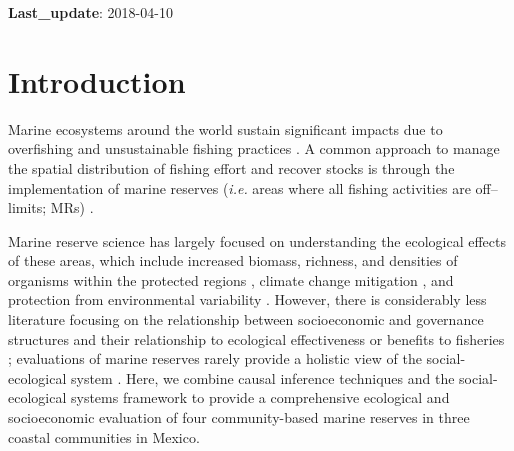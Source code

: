 \documentclass{frontiersSCNS}
\theoremstyle{definition}
\theoremstyle{definition}
\theoremstyle{definition}
\theoremstyle{remark}
\begin{document}
\textbf{Last\_update}: 2018-04-10

\clearpage

\section{Introduction}\label{introduction}

Marine ecosystems around the world sustain significant impacts due to
overfishing and unsustainable fishing practices
\citep{halpern_2008-dK,worm_2006-IB,pauly_2005-qV}. A common approach to
manage the spatial distribution of fishing effort and recover stocks is
through the implementation of marine reserves (\emph{i.e.} areas where
all fishing activities are off--limits; MRs)
\citep{afflerbach_2014-HP,krueck_2017-J1,sala_2017-69}.

Marine reserve science has largely focused on understanding the
ecological effects of these areas, which include increased biomass,
richness, and densities of organisms within the protected regions
\citep{lester_2009-Ks,giakoumi_2017-V2,sala_2017-69}, climate change
mitigation \citep{roberts_2017-J9}, and protection from environmental
variability \citep{micheli_2012-EU}. However, there is considerably less
literature focusing on the relationship between socioeconomic and
governance structures and their relationship to ecological effectiveness
\citep{halpern_2013,lpezangarita_2014,mascia_2017-m_} or benefits to
fisheries \citep{krueck_2017-J1}; evaluations of marine reserves rarely
provide a holistic view of the social-ecological system
\citep{lpezangarita_2014}. Here, we combine causal inference techniques
\citep{depalma_2018} and the social-ecological systems framework
\citep{ostrom_2009-hg} to provide a comprehensive ecological and
socioeconomic evaluation of four community-based marine reserves in
three coastal communities in Mexico.
\end{document}

